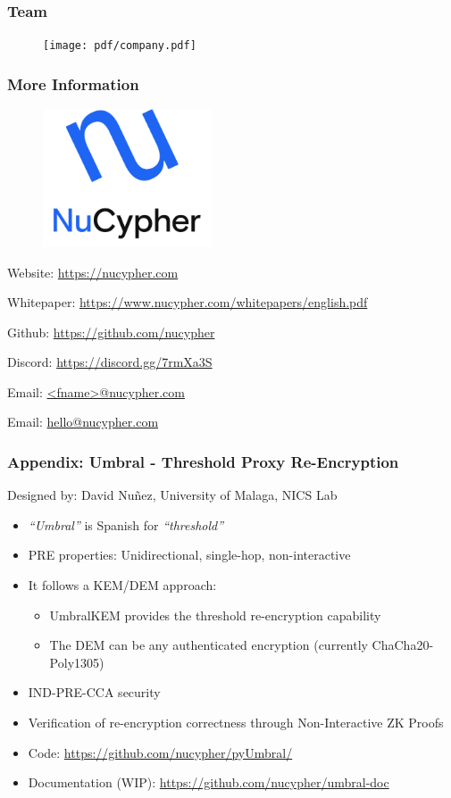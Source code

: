 \documentclass[xetex,mathsans,sans,aspectratio=169]{beamer}
\begin{document}
    \begin{frame}
      \frametitle{Team}
        \begin{figure}
            \centering
            \texttt{[image: pdf/company.pdf]}
        \end{figure}
    \end{frame}

    \begin{frame}
        \frametitle{More Information}
        \begin{figure}
            \centering
            \includegraphics[width=5cm]{pdf/nucypher_logo.pdf}
        \end{figure}
        Website: \url{https://nucypher.com}

        Whitepaper: \url{https://www.nucypher.com/whitepapers/english.pdf}

        Github: \url{https://github.com/nucypher}

        Discord: \url{https://discord.gg/7rmXa3S}

        Email: \href{mailto:<fname>@nucypher.com}{<fname>@nucypher.com}

        Email: \href{mailto:hello@nucypher.com}{hello@nucypher.com}
    \end{frame}

    \begin{frame}
      \frametitle{Appendix: Umbral - Threshold Proxy Re-Encryption}
      Designed by: David Nu\~{n}ez, University of Malaga, NICS Lab
      \begin{itemize}
          \item \emph{``Umbral''} is Spanish for \emph{``threshold''}
          \item PRE properties: Unidirectional, single-hop, non-interactive
          \item It follows a KEM/DEM approach:
          \begin{itemize}
              \item UmbralKEM provides the threshold re-encryption capability
              \item The DEM can be any authenticated encryption (currently ChaCha20-Poly1305)
          \end{itemize}
          \item IND-PRE-CCA security
          \item Verification of re-encryption correctness through Non-Interactive ZK Proofs
          \item Code: \url{https://github.com/nucypher/pyUmbral/}
          \item Documentation (WIP): \url{https://github.com/nucypher/umbral-doc}
      \end{itemize}
    \end{frame}
\end{document}
